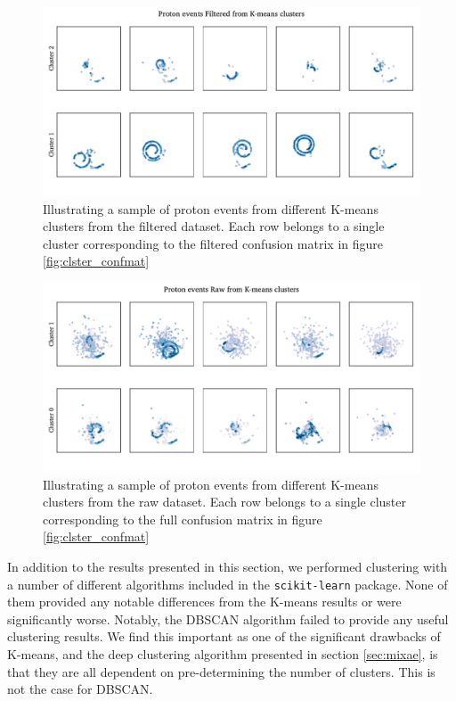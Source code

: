 \documentclass[review,number,sort&compress]{elsarticle}
\begin{document}
\begin{figure}
\includegraphics[width=\textwidth]{custom_work/Filteredexamples.pdf}
\caption[Filtered proton samples by cluster belonging]{Illustrating a sample of proton events from different K-means clusters from the filtered dataset. Each row belongs to a single cluster corresponding to the filtered confusion matrix in figure \ref{fig:clster_confmat}}\label{fig:filtered_vgg_clster_repr}
\end{figure} 

\begin{figure}
\includegraphics[width=\textwidth]{custom_work/Rawexamples.pdf}
\caption[Full proton samples by cluster belonging]{Illustrating a sample of proton events from different K-means clusters from the raw dataset. Each row belongs to a single cluster corresponding to the full confusion matrix in figure \ref{fig:clster_confmat}}\label{fig:full_vgg_clster_repr}
\end{figure} 

In addition to the results presented in this section, we performed clustering with a number of different algorithms included in the \lstinline{scikit-learn} package. None of them provided any notable differences from the K-means results or were significantly worse. Notably, the DBSCAN algorithm \cite{Ester96adensity-based}\cite{Bergstra2012} failed to provide any useful clustering results. We find this important as one of the significant drawbacks of K-means, and the deep clustering algorithm presented in section \ref{sec:mixae}, is that they are all dependent on pre-determining the number of clusters. This is not the case for DBSCAN. 
\end{document}
